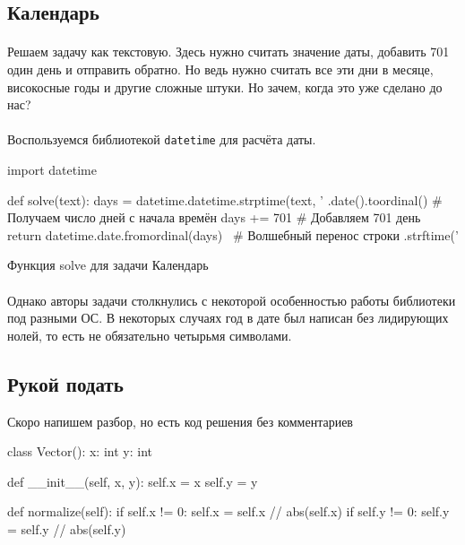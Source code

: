 \documentclass[12pt]{article}
\begin{document}
    \subsection{Календарь}
    \paragraph{}
    Решаем задачу как текстовую.
    Здесь нужно считать значение даты, добавить 701 один день и отправить обратно.
    Но ведь нужно считать все эти дни в месяце, високосные годы и другие сложные штуки.
    Но зачем, когда это уже сделано до нас?
    \paragraph{}
    Воспользуемся библиотекой \verb|datetime| для расчёта даты.
    \begin{listing}[H]
        \begin{pythoncode}
import datetime

def solve(text):
    days = datetime.datetime.strptime(text, '%
               .date().toordinal()                        # Получаем число дней с начала времён
    days += 701                                           # Добавляем 701 день
    return datetime.date.fromordinal(days) \              # Волшебный перенос строки
        .strftime('%
        \end{pythoncode}
        \label{lst:solve9}
        \caption{Функция solve для задачи Календарь}
    \end{listing}
    \paragraph{}
    Однако авторы задачи столкнулись с некоторой особенностью работы библиотеки под разными ОС.
    В некоторых случаях год в дате был написан без лидирующих нолей, то есть не обязательно четырьмя символами.

    \subsection{Рукой подать}
    Скоро напишем разбор, но есть код решения без комментариев
    \begin{listing}[H]
        \begin{pythoncode}
class Vector():
    x: int
    y: int

    def __init__(self, x, y):
        self.x = x
        self.y = y

    def normalize(self):
        if self.x != 0: self.x = self.x // abs(self.x)
        if self.y != 0: self.y = self.y // abs(self.y)
        \end{pythoncode}
    \end{listing}
\end{document}
